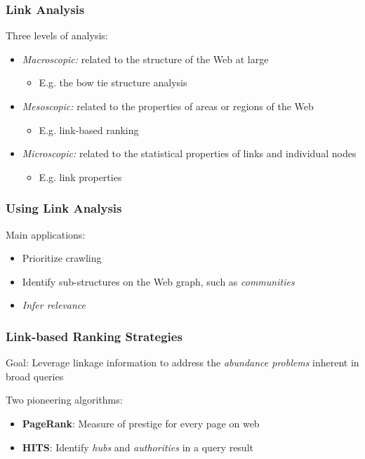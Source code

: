 \documentclass{beamer}
\begin{document}
\begin{frame}
    \frametitle{Link Analysis}
    Three levels of analysis:
    \begin{itemize}
    \item \emph{Macroscopic:} related to the structure of the Web at large
        \begin{itemize}
        \item E.g. the bow tie structure analysis
        \end{itemize}
    \item \emph{Mesoscopic:} related to the properties of areas or regions of
        the Web
        \begin{itemize}
        \item E.g. link-based ranking
        \end{itemize}
    \item \emph{Microscopic:} related to the statistical properties of links
        and individual nodes
        \begin{itemize}
        \item E.g. link properties
        \end{itemize}
    \end{itemize}
\end{frame}

\begin{frame}
    \frametitle{Using Link Analysis}
    Main applications:
    \begin{itemize}
    \item Prioritize crawling
    \item Identify sub-structures on the Web graph, such as \emph{communities} 
    \item \emph{Infer relevance}
    \end{itemize}
\end{frame}

\begin{frame}
  \frametitle{Link-based Ranking Strategies}
  Goal: Leverage linkage information to address the \textit{abundance problems} inherent in broad queries
  \begin{block}{Two pioneering algorithms:}
      \begin{itemize}
      \item \textbf{PageRank}: Measure of prestige for every page on web
      \item \textbf{HITS}: Identify \textit{hubs} and \textit{authorities} in a
          query result
      \end{itemize}
  \end{block}
\end{frame}
\end{document}
